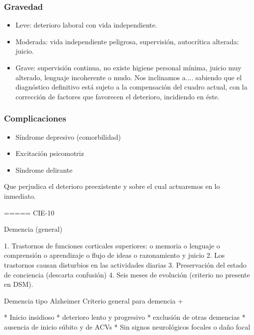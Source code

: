 \subsubsection*{Gravedad}
\begin{itemize}
	\item Leve: deterioro laboral con vida independiente.
	\item Moderada: vida independiente peligrosa, supervisión, autocrítica alterada: juicio.
	\item Grave: supervisión continua, no existe higiene personal mínima, juicio muy alterado, lenguaje incoherente o mudo. Nos inclinamos a.... sabiendo que el diagnóstico definitivo está sujeto a la compensación del cuadro actual, con la corrección de factores que favorecen el deterioro, incidiendo en éste.
\end{itemize}
\subsubsection*{Complicaciones}
\begin{itemize}
	\item Síndrome depresivo (comorbilidad)
	\item Excitación psicomotriz
	\item Síndrome delirante
\end{itemize}
Que perjudica el deterioro preexistente y sobre el cual actuaremos en lo inmediato.

===== CIE-10

Demencia (general)

1. Trastornos de funciones corticales superiores: o memoria o lenguaje o comprensión o aprendizaje o flujo de ideas o razonamiento y juicio
2. Los trastornos causan disturbios en las actividades diarias
3. Preservación del estado de conciencia (descarta confusión)
4. Seis meses de evolución (criterio no presente en DSM).

Demencia tipo Alzheimer Criterio general para demencia +

* Inicio insidioso
* deterioro lento y progresivo
* exclusión de otras demencias
* ausencia de inicio súbito y de ACVs
* Sin signos neurológicos focales o daño focal
